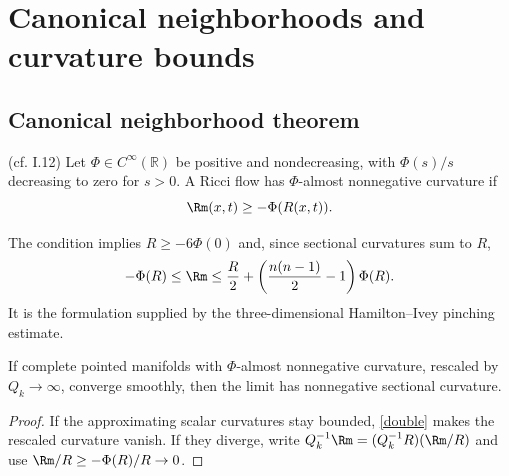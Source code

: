 \section{Canonical neighborhoods and curvature bounds}
\subsection{Canonical neighborhood theorem}
\label{I.12.1}
\begin{definition}
\label{def:kl-canonical-neighborhood-theorem-almost-nonnegative-curvature}

(cf. I.12) \label{pinchingdef}
Let $\Phi\in C^\infty(\mathbb R)$ be positive and nondecreasing, with
$\Phi(s)/s$ decreasing to zero for $s>0$.  A Ricci flow has
$\Phi$-almost nonnegative curvature if
\begin{equation}\label{phieqnn}
\Rm(x,t)\geq-\Phi(R(x,t)).
\end{equation}
\end{definition}
\begin{remark}
\label{rem:kl-canonical-neighborhood-theorem-existence-canonical-neighborhoods}


The condition implies $R\geq-6\Phi(0)$ and, since sectional curvatures sum
to $R$,
\begin{equation}\label{double}
-\Phi(R)\leq\Rm\leq\frac R2+
\left(\frac{n(n-1)}2-1\right)\Phi(R).
\end{equation}
It is the formulation supplied by the three-dimensional Hamilton--Ivey
pinching estimate.
\end{remark}
\begin{lemma}
\label{lem:kl-canonical-neighborhood-theorem-convergence-canonical-neighborhoods}

\label{almost nonneg}
If complete pointed manifolds with $\Phi$-almost nonnegative curvature,
rescaled by $Q_k\to\infty$, converge smoothly, then the limit has
nonnegative sectional curvature.
\end{lemma}
\begin{proof}
\sketch If the approximating scalar curvatures stay bounded, \eqref{double}
makes the rescaled curvature vanish.  If they diverge, write
$Q_k^{-1}\Rm=(Q_k^{-1}R)(\Rm/R)$ and use
$\Rm/R\geq-\Phi(R)/R\to0$.
\end{proof}
